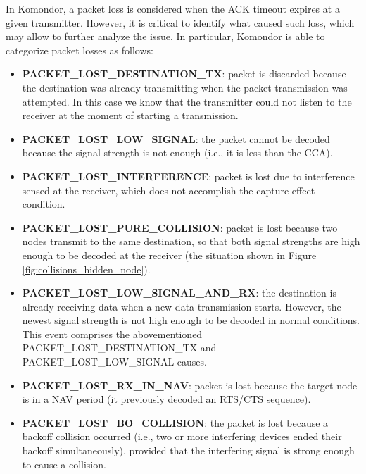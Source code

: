\documentclass[a4paper]{article}
\begin{document}
	In Komondor, a packet loss is considered when the ACK timeout expires at a given transmitter. However, it is critical to identify what caused such loss, which may allow to further analyze the issue. In particular, Komondor is able to categorize packet losses as follows:
	\begin{itemize}
		\item \textbf{PACKET\_LOST\_DESTINATION\_TX}: packet is discarded because the destination was already transmitting when the packet transmission was attempted. In this case we know that the transmitter could not listen to the receiver at the moment of starting a transmission.
		\item \textbf{PACKET\_LOST\_LOW\_SIGNAL}: the packet cannot be decoded because the signal strength is not enough (i.e., it is less than the CCA).
		\item \textbf{PACKET\_LOST\_INTERFERENCE}: packet is lost due to interference sensed at the receiver, which does not accomplish the capture effect condition.	
		\item \textbf{PACKET\_LOST\_PURE\_COLLISION}: packet is lost because two nodes transmit to the same destination, so that both signal strengths are high enough to be decoded  at the receiver (the situation shown in Figure \ref{fig:collisions_hidden_node}).
		\item \textbf{PACKET\_LOST\_LOW\_SIGNAL\_AND\_RX}: the destination is already receiving data when a new data transmission starts. However, the newest signal strength is not high enough to be decoded in normal conditions. This event comprises the abovementioned PACKET\_LOST\_DESTINATION\_TX and PACKET\_LOST\_LOW\_SIGNAL causes.
		\item \textbf{PACKET\_LOST\_RX\_IN\_NAV}: packet is lost because the target node is in a NAV period (it previously decoded an RTS/CTS sequence).		
		\item \textbf{PACKET\_LOST\_BO\_COLLISION}: the packet is lost because a backoff collision occurred (i.e., two or more interfering devices ended their backoff simultaneously), provided that the interfering signal is strong enough to cause a collision.
	\end{itemize}	
	
\end{document}
